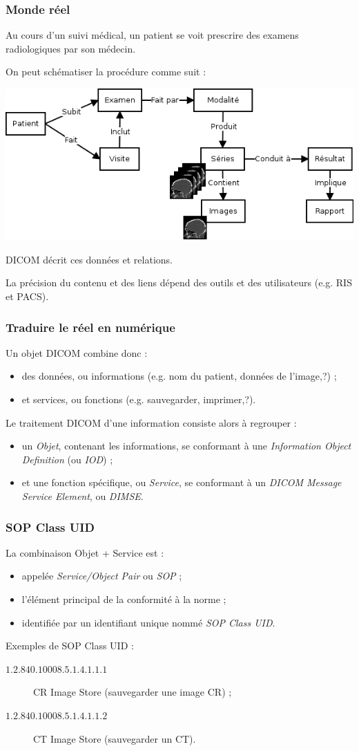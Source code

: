 	\frame
	{
		\frametitle{Monde r\'eel}
		Au cours d'un suivi m\'edical, un patient se voit prescrire des examens radiologiques par son m\'edecin.
		
		On peut sch\'ematiser la proc\'edure comme suit :
		
		\includegraphics[width=\linewidth]{./figures/scenario.png}
		
		DICOM d\'ecrit ces donn\'ees et relations.
		
		La pr\'ecision du contenu et des liens d\'epend des outils et des utilisateurs (e.g. RIS et PACS).
	}

	\frame
	{
		\frametitle{Traduire le r\'eel en num\'erique}
		
		Un objet DICOM combine donc :
		\begin{itemize}
			\item des donn\'ees, ou informations (e.g. nom du patient, donn\'ees de l'image,?) ;
			\item et services, ou fonctions (e.g. sauvegarder, imprimer,?).
		\end{itemize}
		
		Le traitement DICOM d'une information consiste alors \`a regrouper :
		\begin{itemize}
			\item un \emph{Objet}, contenant les informations, se conformant \`a une \emph{Information Object Definition} (ou \emph{IOD}) ;
			\item et une fonction sp\'ecifique, ou \emph{Service}, se conformant \`a un \emph{DICOM Message Service Element}, ou \emph{DIMSE}.
		\end{itemize}
	}
	
	\frame
	{
		\frametitle{SOP Class UID}		

		La combinaison Objet + Service est :
		\begin{itemize}
			\item appel\'ee \emph{Service/Object Pair} ou \emph{SOP} ;
			\item l'\'el\'ement principal de la conformit\'e \`a la norme ;
			\item identifi\'ee par un identifiant unique nomm\'e \emph{SOP Class UID}.
		\end{itemize}
		
		Exemples de SOP Class UID :
		\begin{description}
			\item[$1.2.840.10008.5.1.4.1.1.1$] CR Image Store (sauvegarder  une image CR) ;
			\item[$1.2.840.10008.5.1.4.1.1.2$] CT Image Store (sauvegarder  un CT).
		\end{description}
	}
	
